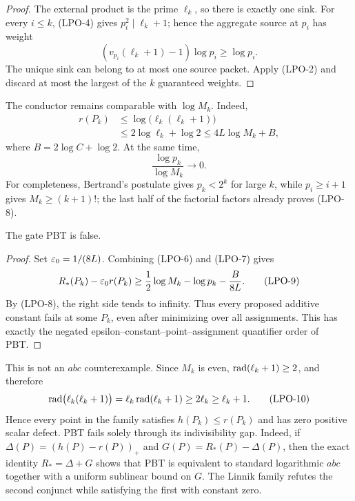 \begin{proof}
The external product is the prime $\ell_k$, so there is exactly one sink.
For every $i\le k$, (LPO-4) gives $p_i^2\mid\ell_k+1$; hence the aggregate
source at $p_i$ has weight
\[
 (v_{p_i}(\ell_k+1)-1)\log p_i\ge\log p_i.
\]
The unique sink can belong to at most one source packet.  Apply (LPO-2) and
discard at most the largest of the $k$ guaranteed weights.
\end{proof}

The conductor remains comparable with $\log M_k$.  Indeed,
\[
 \begin{aligned}
 r(P_k)
 &\le \log\bigl(\ell_k(\ell_k+1)\bigr)\\
 &\le 2\log\ell_k+\log2
 \le4L\log M_k+B,
 \end{aligned}
 \tag{LPO-7}
\]
where $B=2\log C+\log2$.  At the same time,
\[
                         \frac{\log p_k}{\log M_k}\longrightarrow0.
 \tag{LPO-8}
\]
For completeness, Bertrand's postulate gives $p_k<2^k$ for large $k$, while
$p_i\ge i+1$ gives $M_k\ge(k+1)!$; the last half of the factorial factors
already proves (LPO-8).

\begin{theorem}
\label{thm:linnik-packet-obstruction}
The gate \textup{PBT} is false.
\end{theorem}

\begin{proof}
Set $\varepsilon_0=1/(8L)$.  Combining (LPO-6) and (LPO-7) gives
\[
 R_*(P_k)-\varepsilon_0r(P_k)
 \ge \frac12\log M_k-\log p_k-\frac{B}{8L}.
 \tag{LPO-9}
\]
By (LPO-8), the right side tends to infinity.  Thus every proposed additive
constant fails at some $P_k$, even after minimizing over all assignments.
This has exactly the negated epsilon--constant--point--assignment quantifier
order of PBT.
\end{proof}

This is not an $abc$ counterexample.  Since $M_k$ is even,
$\operatorname{rad}(\ell_k+1)\ge2$, and therefore
\[
 \operatorname{rad}\bigl(\ell_k(\ell_k+1)\bigr)
 =\ell_k\operatorname{rad}(\ell_k+1)\ge2\ell_k\ge\ell_k+1.
 \tag{LPO-10}
\]
Hence every point in the family satisfies $h(P_k)\le r(P_k)$ and has zero
positive scalar defect.  PBT fails solely through its indivisibility gap.
Indeed, if $\Delta(P)=(h(P)-r(P))_+$ and
$G(P)=R_*(P)-\Delta(P)$, then the exact identity
$R_*=\Delta+G$ shows that PBT is equivalent to standard logarithmic $abc$
together with a uniform sublinear bound on $G$.  The Linnik family refutes the
second conjunct while satisfying the first with constant zero.

